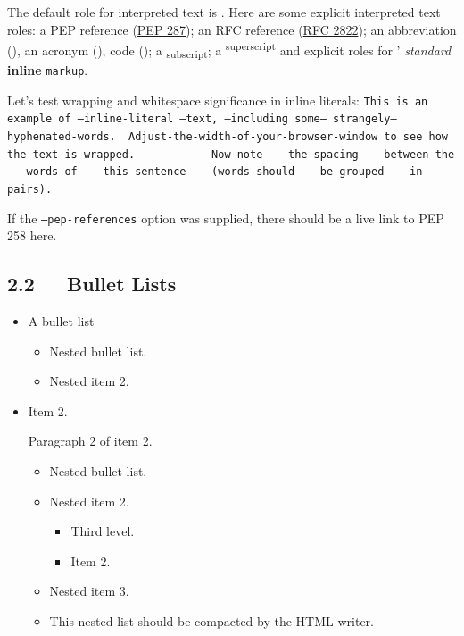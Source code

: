 \documentclass[a4paper]{article}
\begin{document}
The default role for interpreted text is .  Here are
some explicit interpreted text roles: a PEP reference (\href{http://www.python.org/dev/peps/pep-0287}{PEP 287}); an
RFC reference (\href{http://tools.ietf.org/html/rfc2822.html}{RFC 2822}); an abbreviation (), an acronym
(), code (\texttt{}); a \textsubscript{subscript};
a \textsuperscript{superscript} and explicit roles for ’
\emph{standard} \textbf{inline} \texttt{markup}.


Let’s test wrapping and whitespace significance in inline literals:
\texttt{This is an example of --inline-literal --text, --including some--
strangely--hyphenated-words. ~Adjust-the-width-of-your-browser-window
to see how the text is wrapped. ~-- ---- -------- ~Now note ~ ~the
spacing ~ ~between the ~ ~words of ~ ~this sentence ~ ~(words
should ~ ~be grouped ~ ~in pairs).}

If the \texttt{--pep-references} option was supplied, there should be a
live link to PEP 258 here.


\subsection{2.2   Bullet Lists%
  \label{bullet-lists}%
}

\begin{itemize}
\item A bullet list

\begin{itemize}
\item Nested bullet list.

\item Nested item 2.
\end{itemize}

\item Item 2.

Paragraph 2 of item 2.

\begin{itemize}
\item Nested bullet list.

\item Nested item 2.

\begin{itemize}
\item Third level.

\item Item 2.
\end{itemize}

\item Nested item 3.

\item This nested list should be compacted by the HTML writer.
%
\label{target}
\end{itemize}
\end{itemize}
\end{document}
